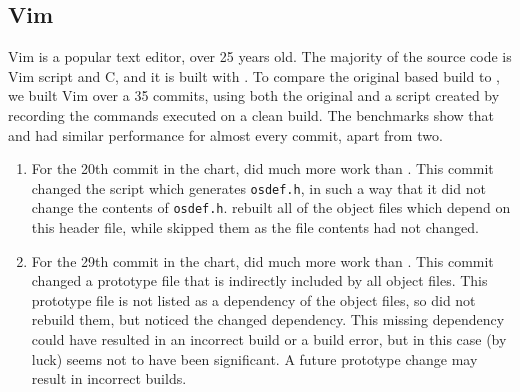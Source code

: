 \subsection{Vim}
\label{sec:eval:vim}


Vim is a popular text editor, over 25 years old. The majority of the source code is Vim script and C, and it is built with \Make. To compare the original \Make based build to \Rattle, we built Vim over a 35 commits, using both the original \Make and a \Rattle script created by recording the commands \Make executed on a clean build. The benchmarks show that \Make and \Rattle had similar performance for almost every commit, apart from two.

\begin{enumerate}
\item For the 20th commit in the chart, \Make did much more work than \Rattle. This commit changed the script which generates \texttt{osdef.h}, in such a way that it did not change the contents of \texttt{osdef.h}. \Make rebuilt all of the object files which depend on this header file, while \Rattle skipped them as the file contents had not changed.
\item For the 29th commit in the chart, \Rattle did much more work than \Make. This commit changed a prototype file that is indirectly included by all object files.  This prototype file is not listed as a dependency of the object files, so \Make did not rebuild them, but \Rattle noticed the changed dependency.  This missing dependency could have resulted in an incorrect build or a build error, but in this case (by luck) seems not to have been significant. A future prototype change may result in incorrect builds.
\end{enumerate}

